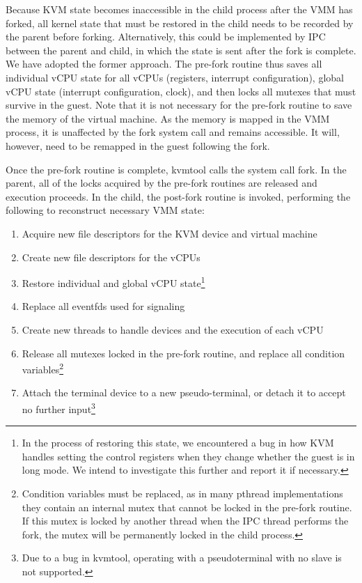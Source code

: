 Because KVM state becomes inaccessible in the child process after the VMM has
forked, all kernel state that must be restored in the child needs to be
recorded by the parent before forking. Alternatively, this could be implemented
by IPC between the parent and child, in which the state is sent after the fork
is complete. We have adopted the former approach. The pre-fork routine thus
saves all individual vCPU state for all vCPUs (registers, interrupt
configuration), global vCPU state (interrupt configuration, clock), and then
locks all mutexes that must survive in the guest. Note that it is not necessary
for the pre-fork routine to save the memory of the virtual machine. As the
memory is mapped in the VMM process, it is unaffected by the fork system call
and remains accessible. It will, however, need to be remapped in the guest
following the fork.

Once the pre-fork routine is complete, kvmtool calls the system call fork. In
the parent, all of the locks acquired by the pre-fork routines are released and
execution proceeds. In the child, the post-fork routine is invoked, performing
the following to reconstruct necessary VMM state:

\begin{enumerate}
\item Acquire new file descriptors for the KVM device and virtual machine
\item Create new file descriptors for the vCPUs
\item Restore individual and global vCPU state\footnote{In the process of
restoring this state, we encountered a bug in how KVM handles setting the
control registers when they change whether the guest is in long mode. We intend
to investigate this further and report it if necessary.}
\item Replace all eventfds used for signaling
\item Create new threads to handle devices and the execution of each vCPU
\item Release all mutexes locked in the pre-fork routine, and replace all
condition variables\footnote{Condition variables must be replaced, as in many
pthread implementations they contain an internal mutex that cannot be locked in
the pre-fork routine. If this mutex is locked by another thread when the IPC
thread performs the fork, the mutex will be permanently locked in the child
process.}
\item Attach the terminal device to a new pseudo-terminal, or detach it to
accept no further input\footnote{Due to a bug in kvmtool, operating with a
pseudoterminal with no slave is not supported.}
\end{enumerate}

